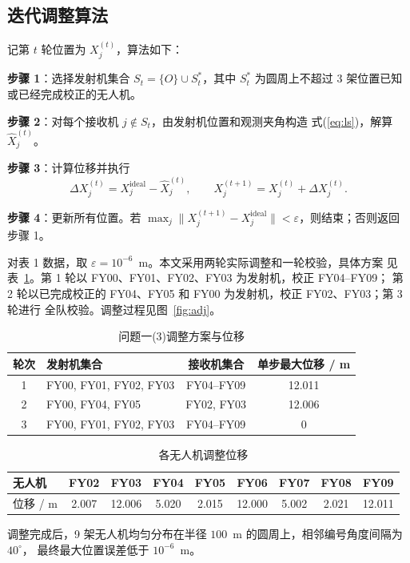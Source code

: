 \documentclass[UTF8,a4paper,11pt]{ctexart}
\begin{document}
\subsection{迭代调整算法}

记第 $t$ 轮位置为 $X_j^{(t)}$，算法如下：

\textbf{步骤 1}：选择发射机集合 $S_t=\{O\}\cup S_t^*$，其中 $S_t^*$ 为圆周上不超过
3 架位置已知或已经完成校正的无人机。

\textbf{步骤 2}：对每个接收机 $j\notin S_t$，由发射机位置和观测夹角构造
式(\ref{eq:ls})，解算 $\hat X_j^{(t)}$。

\textbf{步骤 3}：计算位移并执行
\[
\Delta X_j^{(t)}=X_j^{\mathrm{ideal}}-\hat X_j^{(t)},
\qquad X_j^{(t+1)}=X_j^{(t)}+\Delta X_j^{(t)}.
\]

\textbf{步骤 4}：更新所有位置。若
$\max_j\|X_j^{(t+1)}-X_j^{\mathrm{ideal}}\|<\varepsilon$，则结束；否则返回步骤 1。

对表 1 数据，取 $\varepsilon=10^{-6}$~m。本文采用两轮实际调整和一轮校验，具体方案
见表~\ref{tab:q13}。第 1 轮以 FY00、FY01、FY02、FY03 为发射机，校正 FY04--FY09；
第 2 轮以已完成校正的 FY04、FY05 和 FY00 为发射机，校正 FY02、FY03；第 3 轮进行
全队校验。调整过程见图~\ref{fig:adj}。

\begin{table}[H]
\centering
\caption{问题一(3)调整方案与位移}
\label{tab:q13}
\begin{tabular}{clcc}
\toprule
轮次 & 发射机集合 & 接收机集合 & 单步最大位移 / m \\
\midrule
1 & FY00, FY01, FY02, FY03 & FY04--FY09 & 12.011 \\
2 & FY00, FY04, FY05 & FY02, FY03 & 12.006 \\
3 & FY00, FY01, FY02, FY03 & FY04--FY09 & 0 \\
\bottomrule
\end{tabular}
\end{table}

\begin{table}[H]
\centering
\caption{各无人机调整位移}
\label{tab:q13mov}
\begin{tabular}{lcccccccc}
\toprule
无人机 & FY02 & FY03 & FY04 & FY05 & FY06 & FY07 & FY08 & FY09 \\
\midrule
位移 / m & 2.007 & 12.006 & 5.020 & 2.015 & 12.000 & 5.002 & 2.021 & 12.011 \\
\bottomrule
\end{tabular}
\end{table}

调整完成后，9 架无人机均匀分布在半径 $100$~m 的圆周上，相邻编号角度间隔为 $40^\circ$，
最终最大位置误差低于 $10^{-6}$~m。
\end{document}
